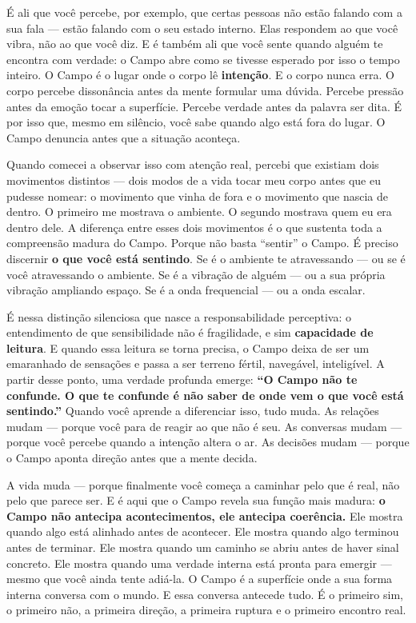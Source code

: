 \documentclass[12pt]{book}
\begin{document}
É ali que você percebe, por exemplo, que certas pessoas não estão falando com a sua fala --- estão falando com o seu estado interno. Elas respondem ao que você vibra, não ao que você diz. E é também ali que você sente quando alguém te encontra com verdade: o Campo abre como se tivesse esperado por isso o tempo inteiro. O Campo é o lugar onde o corpo lê \textbf{intenção}. E o corpo nunca erra. O corpo percebe dissonância antes da mente formular uma dúvida. Percebe pressão antes da emoção tocar a superfície. Percebe verdade antes da palavra ser dita. É por isso que, mesmo em silêncio, você sabe quando algo está fora do lugar. O Campo denuncia antes que a situação aconteça.

Quando comecei a observar isso com atenção real, percebi que existiam dois movimentos distintos --- dois modos de a vida tocar meu corpo antes que eu pudesse nomear: o movimento que vinha de fora e o movimento que nascia de dentro. O primeiro me mostrava o ambiente. O segundo mostrava quem eu era dentro dele. A diferença entre esses dois movimentos é o que sustenta toda a compreensão madura do Campo. Porque não basta \enquote{sentir} o Campo. É preciso discernir \textbf{o que você está sentindo}. Se é o ambiente te atravessando --- ou se é você atravessando o ambiente. Se é a vibração de alguém --- ou a sua própria vibração ampliando espaço. Se é a onda frequencial --- ou a onda escalar.

É nessa distinção silenciosa que nasce a responsabilidade perceptiva: o entendimento de que sensibilidade não é fragilidade, e sim \textbf{capacidade de leitura}. E quando essa leitura se torna precisa, o Campo deixa de ser um emaranhado de sensações e passa a ser terreno fértil, navegável, inteligível. A partir desse ponto, uma verdade profunda emerge: \textbf{\enquote{O Campo não te confunde. O que te confunde é não saber de onde vem o que você está sentindo.}} Quando você aprende a diferenciar isso, tudo muda. As relações mudam --- porque você para de reagir ao que não é seu. As conversas mudam --- porque você percebe quando a intenção altera o ar. As decisões mudam --- porque o Campo aponta direção antes que a mente decida.

A vida muda --- porque finalmente você começa a caminhar pelo que é real, não pelo que parece ser. E é aqui que o Campo revela sua função mais madura: \textbf{o Campo não antecipa acontecimentos, ele antecipa coerência.} Ele mostra quando algo está alinhado antes de acontecer. Ele mostra quando algo terminou antes de terminar. Ele mostra quando um caminho se abriu antes de haver sinal concreto. Ele mostra quando uma verdade interna está pronta para emergir --- mesmo que você ainda tente adiá-la. O Campo é a superfície onde a sua forma interna conversa com o mundo. E essa conversa antecede tudo. É o primeiro sim, o primeiro não, a primeira direção, a primeira ruptura e o primeiro encontro real.
\end{document}
